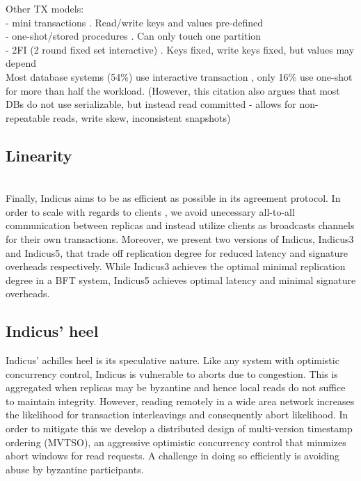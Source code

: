 
Other TX models:\\
- mini transactions \cite{aguilera2007sinfonia}. Read/write keys and values pre-defined\\
- one-shot/stored procedures \cite{mu2016consolidating, mu2014extracting}. Can only touch one partition\\
- 2FI (2 round fixed set interactive) \cite{yan2018carousel}. Keys fixed, write keys fixed, but values may depend\\
Most database systems (54\%) use interactive transaction \cite{pavlo2017we}, only 16\% use one-shot for more than half the workload. (However, this citation also argues that most DBs do not use serializable, but instead read committed - allows for non-repeatable reads, write skew, inconsistent snapshots)

\subsection{Linearity}
\\
Finally, Indicus aims to be as efficient as possible in its agreement protocol. In order to scale with regards to clients , we avoid unecessary all-to-all communication between replicas and instead utilize clients as broadcasts channels for their own transactions. Moreover, we present two versions of Indicus, Indicus3 and Indicus5, that trade off replication degree for reduced latency and signature overheads respectively. While Indicus3 achieves the optimal minimal replication degree in a BFT system, Indicus5 achieves optimal latency and minimal signature overheads.


\subsection{Indicus' heel}
Indicus' achilles heel is its speculative nature. Like any system with optimistic concurrency control, Indicus is vulnerable to aborts due to congestion. This is aggregated when replicas may be byzantine and hence local reads do not suffice to maintain integrity. However, reading remotely in a wide area network increases the likelihood for transaction interleavings and consequently abort likelihood. In order to mitigate this we develop a distributed design of multi-version timestamp ordering (MVTSO), an aggressive optimistic concurrency control that minmizes abort windows for read requests. A challenge in doing so efficiently is avoiding abuse by byzantine participants. 

